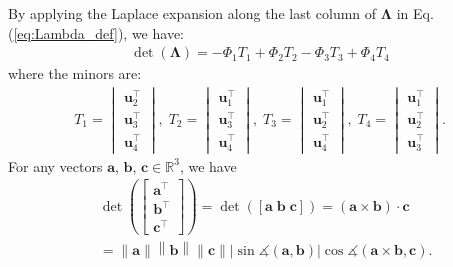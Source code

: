 \documentclass[journal]{IEEEtran}
\newcommand{\norm}[1]{\left\lVert#1\right\rVert}
\def\detL{\det(\mathbf{\Lambda})}
\begin{document}
By applying the Laplace expansion along the last column of $\mathbf{\Lambda}$ in Eq. (\ref{eq:Lambda_def}), we have:
\begin{equation}\label{eq:det_Lambda_Laplace_expansion}
\begin{aligned}
    \detL = -\Phi_1 T_1 + \Phi_2 T_2 - \Phi_3 T_3 + \Phi_4 T_4
\end{aligned}
\end{equation}
where the minors are:
\begin{equation}\label{eq:det_Lambda_minors_original}
\begin{aligned}
    T_1 {=} 
    \begin{vmatrix}
        \mathbf{u}_2^\top \\[0.2em]
        \mathbf{u}_3^\top \\[0.2em]
        \mathbf{u}_4^\top
    \end{vmatrix},\;%
    T_2 {=} 
    \begin{vmatrix}
        \mathbf{u}_1^\top \\[0.2em]
        \mathbf{u}_3^\top \\[0.2em]
        \mathbf{u}_4^\top
    \end{vmatrix},\;%
    T_3 {=} 
    \begin{vmatrix}
        \mathbf{u}_1^\top \\[0.2em]
        \mathbf{u}_2^\top \\[0.2em]
        \mathbf{u}_4^\top
    \end{vmatrix},\;%
    T_4 {=}
    \begin{vmatrix}
        \mathbf{u}_1^\top \\[0.2em]
        \mathbf{u}_2^\top \\[0.2em]
        \mathbf{u}_3^\top
    \end{vmatrix}.%
\end{aligned}
\end{equation}
For any vectors $\mathbf{a}$, $\mathbf{b}$, $\mathbf{c} \in \mathbb{R}^3$, we have 
\begin{equation}
\begin{aligned}
    &\det \left(
    \begin{bmatrix}
        \mathbf{a}^\top \\
        \mathbf{b}^\top \\
        \mathbf{c}^\top
    \end{bmatrix} \right)
    = \det([\mathbf{a} \; \mathbf{b} \; \mathbf{c}]) 
    = (\mathbf{a} \times \mathbf{b}) \cdot \mathbf{c} \\
    &= \norm{\mathbf{a}} \norm{\mathbf{b}} \norm{\mathbf{c}} 
    \left| \sin \measuredangle (\mathbf{a}, \mathbf{b}) \right|
    \cos \measuredangle (\mathbf{a} \times \mathbf{b}, \mathbf{c}).
\end{aligned}
\end{equation}
\end{document}
